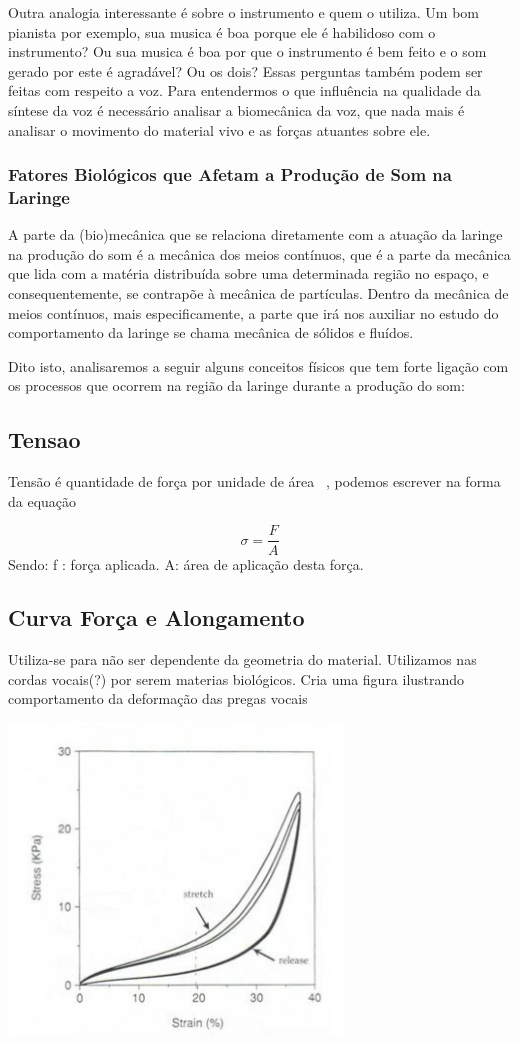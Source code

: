 	Outra analogia interessante é sobre o instrumento e quem o utiliza. Um bom pianista por exemplo, sua musica é boa porque ele é habilidoso com o instrumento? Ou sua musica é boa por que o instrumento é bem feito e o som gerado por este é agradável? Ou os dois? Essas perguntas também podem ser feitas com respeito a voz. Para entendermos o que inﬂuência na qualidade da síntese da voz é necessário analisar a biomecânica da voz, que nada mais é analisar o movimento do material vivo e as forças atuantes sobre ele\cite{IngoTitze}.
	
	\subsubsection{ Fatores Biológicos que Afetam a Produção de Som na Laringe }
	
	A parte da (bio)mecânica que se relaciona diretamente com a atuação da laringe na produção do som é a mecânica dos meios contínuos, que é a parte da mecânica que lida com a matéria distribuída sobre uma determinada região no espaço, e consequentemente, se contrapõe à mecânica de partículas. Dentro da mecânica de meios contínuos, mais especiﬁcamente, a parte que irá nos auxiliar no estudo do comportamento da laringe se chama mecânica de sólidos e ﬂuídos.
	
	Dito isto, analisaremos a seguir alguns conceitos físicos que tem forte ligação com os processos que ocorrem na região da laringe durante a produção do som: 

	\subsection{Tensao}
	Tensão é quantidade de força por unidade de área~\cite{IngoTitze} , podemos escrever na forma da equação

	\[
	\sigma = \frac{F}{A}
	\]
	Sendo:
	f : força aplicada. \linebreak
	A: área de aplicação desta força.
	
	\subsection{Curva Força e Alongamento}
	Utiliza-se para não ser dependente da geometria do material. Utilizamos nas cordas vocais(?) por serem materias biológicos. Cria uma figura ilustrando comportamento da deformação das pregas vocais
	
	\includegraphics{figura1.png}
	
